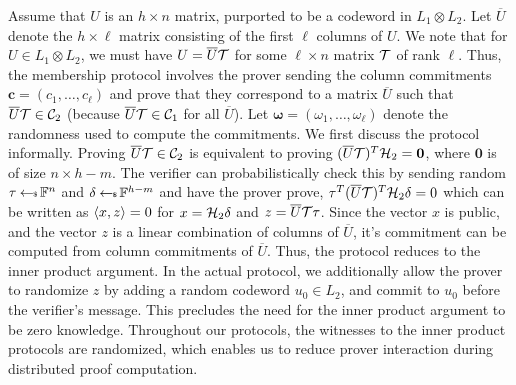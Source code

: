 Assume that $U$ is an $h\times n$ matrix, purported to be a codeword in
$L_1\otimes L_2$. Let $\overline{U}$ denote the $h\times \ell$ matrix consisting of
the first $\ell$ columns of $U$. We note that for $U\in L_1\otimes L_2$, we must
have $U=\overline{U}\mathcal{T}$ for some $\ell \times n$ matrix $\mathcal{T}$ of rank $\ell$. Thus, the membership protocol involves the prover sending the column
commitments $\bm{c}=(c_1,\ldots,c_\ell)$ and prove that they correspond to a matrix
$\overline{U}$ such that $\overline{U}\mathcal{T}\in \mathcal{C}_2$ (because $\overline{U}\mathcal{T}\in
\mathcal{C}_1$ for all $\overline{U}$). Let $\bm{\omega}=(\omega_1,\ldots,\omega_\ell)$ denote 
the randomness used to compute the commitments. We first discuss the protocol
informally. Proving $\overline{U}\mathcal{T}\in \mathcal{C}_2$ is equivalent to proving
$(\overline{U}\mathcal{T})^T\mathcal{H}_2=\bm{0}$, where $\bm{0}$ is of size ${n \times h-m}$. The verifier can probabilistically
check this by sending random $\tau\hskip2.3pt{\gets\!\!\mbox{\tiny${\$}$\normalsize}}\, \mathbb{F}^n$ and $\delta\hskip2.3pt{\gets\!\!\mbox{\tiny${\$}$\normalsize}}\, \mathbb{F}^{h-m}$
and have the prover prove, $\tau^T(\overline{U}\mathcal{T})^T\mathcal{H}_2\delta=0$ which
can be written as $\langle x,z\rangle=0$ for $x=\mathcal{H}_2\delta$ and
$z=\overline{U}\mathcal{T}\tau$. Since the vector $x$ is public, and the vector $z$
is a linear combination of columns of $\overline{U}$, it's commitment can be
computed from column commitments of $\overline{U}$. Thus, the protocol reduces
to the inner product argument. In the actual protocol, we additionally allow the
prover to randomize $z$ by adding a random codeword $u_0\in L_2$, and commit to
$u_0$ before the verifier's message. This precludes the need for the inner
product argument to be zero knowledge. Throughout our protocols, the witnesses
to the inner product protocols are randomized, which enables us to reduce prover
interaction during distributed proof computation. 

